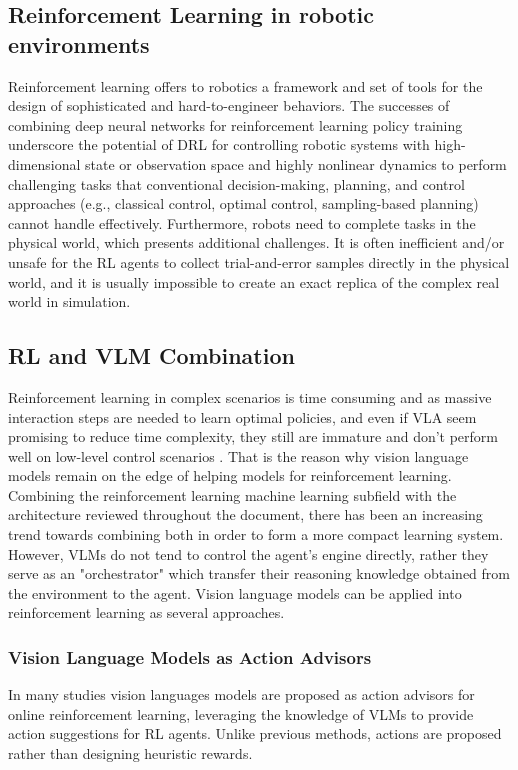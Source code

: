 \subsection{Reinforcement Learning in robotic environments}
Reinforcement learning offers to robotics a framework and set of tools for the design of sophisticated and hard-to-engineer behaviors. The successes of combining deep neural networks for reinforcement learning policy training underscore the potential of DRL for controlling robotic systems with
high-dimensional state or observation space and highly nonlinear dynamics to perform challenging tasks that conventional decision-making, planning, and control approaches (e.g.,
classical control, optimal control, sampling-based planning) cannot handle effectively. Furthermore, robots need
to complete tasks in the physical world, which presents additional challenges. It is often
inefficient and/or unsafe for the RL agents to collect trial-and-error samples directly in the
physical world, and it is usually impossible to create an exact replica of the complex real
world in simulation.

\subsection{RL and VLM Combination}
Reinforcement learning in complex scenarios is time consuming and as massive interaction steps are needed to learn optimal policies, and even if VLA seem promising to reduce time complexity, they still are immature and don't perform well on low-level control scenarios \cite{wu2025teachingrlagentsact}. That is the reason why vision language models remain on the edge of helping models for reinforcement learning. Combining the reinforcement learning machine learning subfield with the architecture reviewed throughout the document, there has been an increasing trend towards combining both in order to form a more compact learning system. However, VLMs do not tend to control the agent's engine directly, rather they serve as an "orchestrator" which transfer their reasoning knowledge obtained from the environment to the agent. Vision language models can be applied into reinforcement learning as several approaches.

\subsubsection{Vision Language Models as Action Advisors}
In many studies vision languages models are proposed as action advisors for online reinforcement learning, leveraging the knowledge of VLMs to provide action suggestions for RL agents. Unlike previous methods, actions are proposed rather than designing heuristic rewards. 

